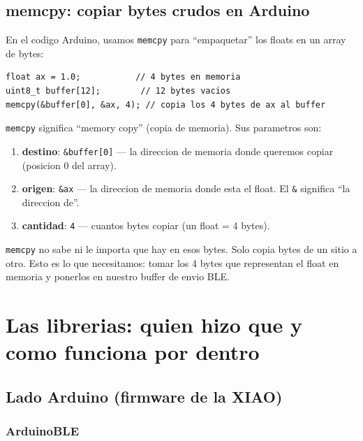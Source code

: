 \documentclass[11pt,a4paper]{article}
\begin{document}
\subsection{memcpy: copiar bytes crudos en Arduino}

En el codigo Arduino, usamos \texttt{memcpy} para ``empaquetar''
los floats en un array de bytes:

\begin{lstlisting}[style=arduino]
float ax = 1.0;           // 4 bytes en memoria
uint8_t buffer[12];        // 12 bytes vacios
memcpy(&buffer[0], &ax, 4); // copia los 4 bytes de ax al buffer
\end{lstlisting}

\texttt{memcpy} significa ``memory copy'' (copia de memoria). Sus
parametros son:
\begin{enumerate}
    \item \textbf{destino}: \texttt{\&buffer[0]} --- la direccion de
          memoria donde queremos copiar (posicion 0 del array).
    \item \textbf{origen}: \texttt{\&ax} --- la direccion de memoria
          donde esta el float. El \texttt{\&} significa ``la direccion
          de''.
    \item \textbf{cantidad}: \texttt{4} --- cuantos bytes copiar (un
          float = 4 bytes).
\end{enumerate}

\texttt{memcpy} no sabe ni le importa que hay en esos bytes. Solo
copia bytes de un sitio a otro. Esto es lo que necesitamos: tomar
los 4 bytes que representan el float en memoria y ponerlos en
nuestro buffer de envio BLE.


\section{Las librerias: quien hizo que y como funciona por dentro}

\subsection{Lado Arduino (firmware de la XIAO)}

\subsubsection{ArduinoBLE}
\end{document}
